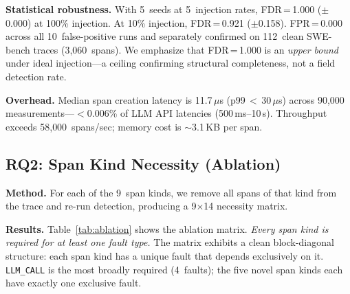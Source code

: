 \documentclass[sigconf,screen]{acmart}
\begin{document}
\textbf{Statistical robustness.}
With 5~seeds at 5~injection rates, FDR\,=\,1.000 ($\pm$0.000) at 100\%
injection.  At 10\% injection, FDR\,=\,0.921 ($\pm$0.158).
FPR\,=\,0.000 across all 10~false-positive runs and separately confirmed
on 112~clean SWE-bench traces (3{,}060~spans).
We emphasize that FDR\,=\,1.000 is an \emph{upper bound} under ideal
injection---a ceiling confirming structural completeness, not a field
detection rate.

\textbf{Overhead.}
Median span creation latency is 11.7\,$\mu$s (p99\,$<$\,30\,$\mu$s)
across 90{,}000 measurements---$<$0.006\% of LLM API latencies
(500\,ms--10\,s).  Throughput exceeds 58{,}000~spans/sec; memory cost
is $\sim$3.1\,KB per span.

\subsection{RQ2: Span Kind Necessity (Ablation)}
\label{sec:ablation}

\textbf{Method.}
For each of the 9~span kinds, we remove all spans of that kind from the
trace and re-run detection, producing a 9$\times$14 necessity matrix.

\textbf{Results.}
Table~\ref{tab:ablation} shows the ablation matrix.  \emph{Every span
kind is required for at least one fault type.}  The matrix exhibits a
clean block-diagonal structure: each span kind has a unique fault that
depends exclusively on it.  \texttt{LLM\_CALL} is the most broadly
required (4~faults); the five novel span kinds each have exactly one
exclusive fault.
\end{document}
